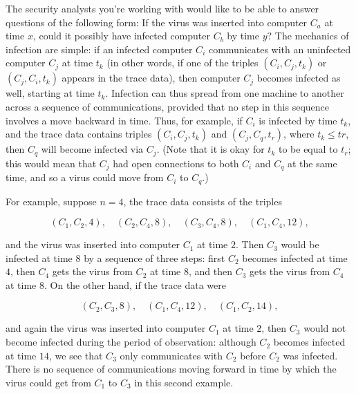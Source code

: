 \documentclass[12pt, letterpaper]{article}
\begin{document}
The security analysts you're working with would like to be able to answer questions of the following form: If the virus was inserted into computer $C_a$ at time $x$, could it possibly have infected computer $C_b$ by time $y$? 
The mechanics of infection are simple: if an infected computer $C_i$ communicates with an uninfected computer $C_j$ at time $t_k$ (in other words, if one of the triples $(C_i , C_j , t_k)$ or $(C_j , C_i , t_k)$ appears in the trace data), then computer $C_j$ becomes infected as well, starting at time $t_k$. 
Infection can thus spread from one machine to another across a sequence of communications, provided that no step in this sequence involves a move backward in time. Thus, for example, if $C_i$ is infected by time $t_k$, and the trace data contains triples $(C_i, C_j, t_k)$ and $(C_j, C_q, t_r)$, where $t_k \leq tr$, then $C_q$ will become infected via $C_j$. (Note that it is okay for $t_k$ to be equal to $t_r$; this would mean that $C_j$ had open connections to both $C_i$ and $C_q$ at the same time, and so a virus could move from $C_i$ to $C_q$.)

For example, suppose $n = 4$, the trace data consists of the triples

\vspace{2mm}
\begin{equation*}
    (C_1 , C_2 , 4), \quad (C_2 , C_4 , 8), \quad (C_3 , C_4 , 8), \quad (C_1 , C_4 , 12),
\end{equation*}
\vspace{2mm}

and the virus was inserted into computer $C_1$ at time $2$. Then $C_3$ would be infected at time $8$ by a sequence of three steps: first $C_2$ becomes infected at time $4$, then $C_4$ gets the virus from $C_2$ at time $8$, and then $C_3$ gets the virus from $C_4$ at time $8$. On the other hand, if the trace data were

\vspace{2mm}
\begin{equation*}
    (C_2 , C_3 , 8), \quad (C_1 , C_4 , 12), \quad (C_1 , C_2 , 14),
\end{equation*}
\vspace{2mm}

and again the virus was inserted into computer $C_1$ at time $2$, then $C_3$ would not become infected during the period of observation: although $C_2$ becomes infected at time $14$, we see that $C_3$ only communicates with $C_2$ before $C_2$ was infected. There is no sequence of communications moving forward in time by which the virus could get from $C_1$ to $C_3$ in this second example.
\end{document}

